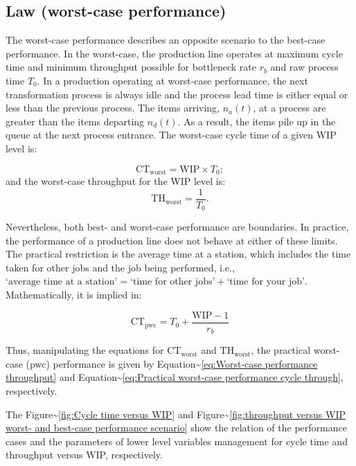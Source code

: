 \documentclass{article}
\begin{document}
\subsection{Law (worst-case performance)}

The worst-case performance describes an opposite scenario to the best-case performance.
In the worst-case, the production line operates at maximum cycle time and minimum throughput possible for bottleneck rate \(r_b\) and raw process time \(T_0\).
In a production operating at worst-case performance, the next transformation process is always idle and the process lead time is either equal or less than the previous process.
The items arriving, \(n_a(t)\), at a process are greater than the items departing \(n_d(t)\).
As a result, the items pile up in the queue at the next process entrance.
The worst-case cycle time of a given WIP level is:

\begin{equation}\label{eq:Worst-case performance cycle through}
    \mbox{CT}_{\mbox{worst}} = \mbox{WIP} \times T_0;
\end{equation}
\nolinebreak
and the worst-case throughput for the WIP level is:
\begin{equation}\label{eq:Worst-case performance throughput}
    \mbox{TH}_{\mbox{worst}} = \frac{1}{T_0}.
\end{equation}

Nevertheless, both best- and worst-case performance are boundaries.
In practice, the performance of a production line does not behave at either of these limits.
The practical restriction is the average time at a station, which includes the time taken for other jobs and the job being performed, i.e., \(\mbox{`average time at a station'} = \mbox{`time for other jobs'} + \mbox{`time for your job'}\).
Mathematically, it is implied in:

\begin{equation}
    \mbox{CT}_{\mbox{pwc}}=T_0 + \frac{\mbox{WIP}-1}{r_b}
\label{eq:Practical worst-case performance cycle through}
\end{equation}

Thus, manipulating the equations for \(\mbox{CT}_{\mbox{worst}}\) and \(\mbox{TH}_{\mbox{worst}}\), the practical worst-case (pwc) performance is given by Equation\textasciitilde{}\ref{eq:Worst-case performance throughput} and Equation\textasciitilde{}\ref{eq:Practical worst-case performance cycle through}, respectively.

The Figure\textasciitilde{}\ref{fig:Cycle time versus WIP} and Figure\textasciitilde{}\ref{fig:throughput versus WIP worst- and best-case performance scenario} show the relation of the performance cases and the parameters of lower level variables management for cycle time and throughput versus WIP, respectively.
\end{document}
